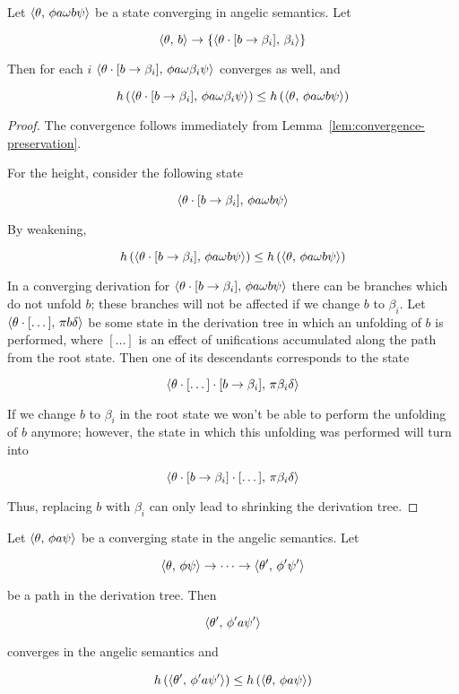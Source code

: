 \begin{lemma}
  \label{lem:height-mono}
  Let $\langle \theta,\,\phi a \omega b \psi \rangle$ be a state converging in angelic semantics. Let
  
  \[
  \langle \theta,\,b \rangle\to\{\langle \theta\cdot[b\to\beta_i],\,\beta_i \rangle\}
  \]

  Then for each $i$ $\langle \theta\cdot[b\to\beta_i],\,\phi a \omega \beta_i \psi \rangle$ converges as well,
  and

  \[
  h\,(\langle \theta\cdot[b\to\beta_i],\,\phi a \omega \beta_i \psi \rangle)\le h\,(\langle \theta,\,\phi a \omega b \psi \rangle)
  \]  
\end{lemma}
\begin{proof}
  The convergence follows immediately from Lemma~\ref{lem:convergence-preservation}.
  
  For the height, consider the following state

  \[
   \langle \theta\cdot[b\to\beta_i],\,\phi a \omega b \psi \rangle
  \]

  By weakening,

  \[
  h\,(\langle \theta\cdot[b\to\beta_i],\,\phi a \omega b \psi \rangle)\le h\,( \langle \theta,\,\phi a \omega b \psi \rangle)
  \]

  In a converging derivation for $\langle \theta\cdot[b\to\beta_i],\,\phi a \omega b \psi \rangle$ there can be branches which do not unfold $b$; these
  branches will not be affected if we change $b$ to $\beta_i$. Let $\langle \theta\cdot[\dots],\,\pi b \delta \rangle$ be some state in the derivation
  tree in which an unfolding of $b$ is performed, where $[\dots]$ is an effect of unifications accumulated along the path from the root state.
  Then one of its descendants corresponds to the state

  \[
  \langle \theta\cdot[\dots]\cdot[b\to\beta_i],\,\pi\beta_i\delta \rangle
  \]
  
  If we change $b$ to $\beta_i$ in the root state we won't be able to perform the unfolding of $b$ anymore; however, the state in which this
  unfolding was performed will turn into

  \[
  \langle \theta\cdot[b\to\beta_i]\cdot[\dots],\,\pi\beta_i\delta \rangle
  \]

  Thus, replacing $b$ with $\beta_i$ can only lead to shrinking the derivation tree.
\end{proof}

\begin{corollary}
  \label{cor:corollary}
  Let $\langle \theta,\,\phi a \psi \rangle$ be a converging state in the angelic semantics. Let

  \[
  \langle \theta,\,\phi\psi \rangle\to\dots\to\langle \theta^\prime,\,\phi^\prime\psi^\prime \rangle
  \]

  be a path in the derivation tree. Then

  \[
  \langle \theta^\prime,\,\phi^\prime a \psi^\prime \rangle
  \]

  converges in the angelic semantics and

  \[
  h\,(\langle \theta^\prime,\,\phi^\prime a \psi^\prime \rangle)\le h\,(\langle \theta,\,\phi a \psi \rangle)
  \]  
\end{corollary}

